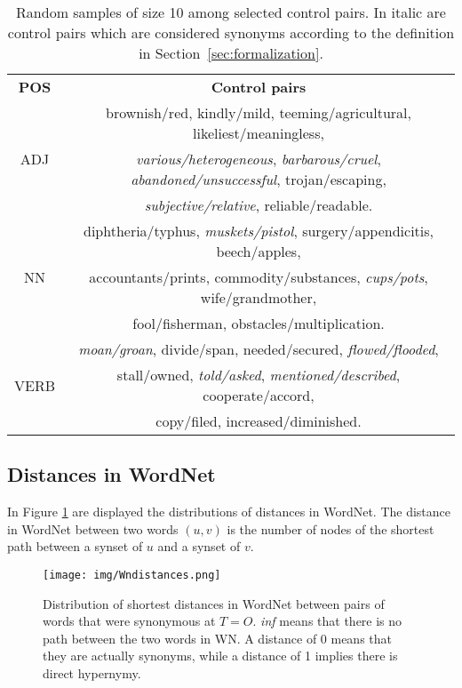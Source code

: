 \documentclass[11pt]{article}
\begin{document}
\begin{table*}[t]
    \centering
    \begin{tabular}{cc}\toprule
        \textbf{POS} & \textbf{Control pairs} \\\cmidrule{1-2}
        \multirow{3}{*}{ADJ} & brownish/red, kindly/mild, teeming/agricultural, likeliest/meaningless, \\
        & \textit{various/heterogeneous}, \textit{barbarous/cruel}, \textit{abandoned/unsuccessful}, trojan/escaping, \\
        & \textit{subjective/relative}, reliable/readable.\\\cmidrule{1-2}
        \multirow{3}{*}{NN} & diphtheria/typhus, \textit{muskets/pistol}, surgery/appendicitis, beech/apples,\\
        & accountants/prints, commodity/substances, \textit{cups/pots}, wife/grandmother,\\
        & fool/fisherman, obstacles/multiplication.\\\cmidrule{1-2}
        \multirow{3}{*}{VERB} & \textit{moan/groan}, divide/span, needed/secured, \textit{flowed/flooded},\\
        & stall/owned, \textit{told/asked}, \textit{mentioned/described}, cooperate/accord,\\
        & copy/filed, increased/diminished.
        \\\bottomrule
    \end{tabular}
    \caption{Random samples of size 10 among selected control pairs. In italic are control pairs which are considered synonyms according to the definition in Section~\ref{sec:formalization}.}
    \label{tab:controls}
\end{table*}


\subsection{Distances in WordNet}
\label{appendix:WNdistances}

In Figure \ref{fig:wndistances} are displayed the distributions of distances in WordNet. The distance in WordNet between two words $(u,v)$ is the number of nodes of the shortest path between a synset of $u$ and a synset of $v$.

\begin{figure}[ht]
    \centering
    \texttt{[image: img/Wndistances.png]}
    \caption{Distribution of shortest distances in WordNet between pairs of words that were synonymous at $T=O$. \textit{inf} means that there is no path between the two words in WN. A distance of 0 means that they are actually synonyms, while a distance of 1 implies there is direct hypernymy.}
    \label{fig:wndistances}
\end{figure}
\end{document}
